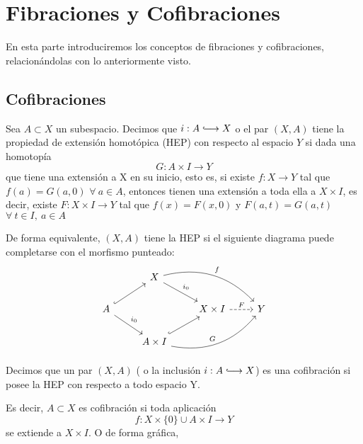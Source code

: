 \chapter{Fibraciones y Cofibraciones}
En esta parte introduciremos los conceptos de fibraciones y cofibraciones, relacionándolas con lo anteriormente visto.
\section{Cofibraciones}
\begin{defin}
Sea $A \subset X$ un subespacio. Decimos que $i : A \longhookrightarrow X$ o el par $(X, A)$ tiene la propiedad de extensión homotópica (HEP) con respecto al espacio $Y$ si dada una homotopía
\[ G : A \times I \longrightarrow Y \]
que tiene una extensión a X en su inicio, esto es, si existe $f: X \longrightarrow Y $ tal que $f(a) = G(a, 0)$ $\forall \ a \in A$, entonces tienen una extensión a toda ella a $X \times I$, es decir, existe $F : X \times I \longrightarrow Y$ tal que $f(x) = F(x,0)$ y $F(a,t) = G(a, t)$ $\forall \ t \in I, \ a \in A$ \par 
De forma equivalente, $(X,A)$ tiene la HEP si el siguiente diagrama puede completarse con el morfismo punteado:
\[
\begin{tikzcd}
	{} 						  & X \drar{i_0} \arrow[bend left]{drr}{f}			   &        					&   \\
	A \urar[hook] \drar{i_0}  &   												   & X \times I \rar[dashed]{F} & Y \\
	   						  & A \times I  \urar[hook] \arrow[bend right]{urr}{G} &   							&
\end{tikzcd}
\]
\end{defin}
\begin{defin}
Decimos que un par $(X,A)$ ( o la inclusión $i: A \longhookrightarrow X$) es una cofibración si posee la HEP con respecto a todo espacio Y. \par 
Es decir, $A \subset X$ es cofibración si toda aplicación  
\[ f : X \times \{0\} \cup A \times I \longrightarrow Y \]
se extiende a $X \times I$.
O de forma gráfica, 
\end{defin}

